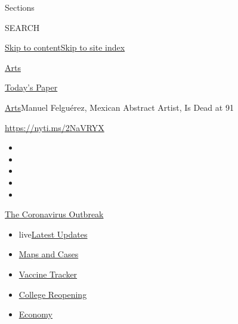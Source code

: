 Sections

SEARCH

\protect\hyperlink{site-content}{Skip to
content}\protect\hyperlink{site-index}{Skip to site index}

\href{https://www.nytimes3xbfgragh.onion/section/arts}{Arts}

\href{https://myaccount.nytimes3xbfgragh.onion/auth/login?response_type=cookie\&client_id=vi}{}

\href{https://www.nytimes3xbfgragh.onion/section/todayspaper}{Today's
Paper}

\href{/section/arts}{Arts}\textbar{}Manuel Felguérez, Mexican Abstract
Artist, Is Dead at 91

\url{https://nyti.ms/2NaVRYX}

\begin{itemize}
\item
\item
\item
\item
\item
\end{itemize}

\href{https://www.nytimes3xbfgragh.onion/news-event/coronavirus?action=click\&pgtype=Article\&state=default\&region=TOP_BANNER\&context=storylines_menu}{The
Coronavirus Outbreak}

\begin{itemize}
\tightlist
\item
  live\href{https://www.nytimes3xbfgragh.onion/2020/08/04/world/coronavirus-covid-19.html?action=click\&pgtype=Article\&state=default\&region=TOP_BANNER\&context=storylines_menu}{Latest
  Updates}
\item
  \href{https://www.nytimes3xbfgragh.onion/interactive/2020/us/coronavirus-us-cases.html?action=click\&pgtype=Article\&state=default\&region=TOP_BANNER\&context=storylines_menu}{Maps
  and Cases}
\item
  \href{https://www.nytimes3xbfgragh.onion/interactive/2020/science/coronavirus-vaccine-tracker.html?action=click\&pgtype=Article\&state=default\&region=TOP_BANNER\&context=storylines_menu}{Vaccine
  Tracker}
\item
  \href{https://www.nytimes3xbfgragh.onion/2020/08/02/us/covid-college-reopening.html?action=click\&pgtype=Article\&state=default\&region=TOP_BANNER\&context=storylines_menu}{College
  Reopening}
\item
  \href{https://www.nytimes3xbfgragh.onion/live/2020/08/03/business/stock-market-today-coronavirus?action=click\&pgtype=Article\&state=default\&region=TOP_BANNER\&context=storylines_menu}{Economy}
\end{itemize}

